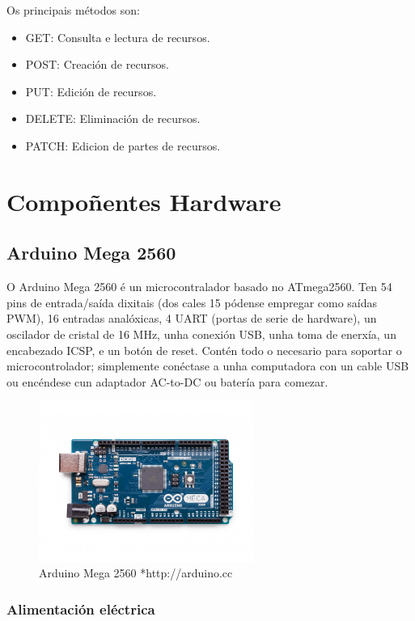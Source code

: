 \documentclass[11pt,twoside]{book}
\begin{document}
Os principais métodos son:

\begin{itemize}
    \item GET: Consulta e lectura de recursos.
    \item POST: Creación de recursos.
    \item PUT: Edición de recursos.
    \item DELETE: Eliminación de recursos.
    \item PATCH: Edicion de partes de recursos.
\end{itemize}

\chapter{Compoñentes Hardware}
\section{Arduino Mega 2560}

O Arduino Mega 2560 é un microcontralador basado no ATmega2560. Ten 54 pins de entrada/saída dixitais (dos cales 15 pódense empregar como saídas PWM), 16 entradas analóxicas, 4 UART (portas de serie de hardware), un oscilador de cristal de 16 MHz, unha conexión USB, unha toma de enerxía, un encabezado ICSP, e un botón de reset. Contén todo o necesario para soportar o microcontrolador; simplemente conéctase a unha computadora con un cable USB ou encéndese cun adaptador AC-to-DC ou batería para comezar. 

\begin{figure}[H]
	\begin{center}
		\includegraphics[width=7cm]{images/arduino_mega.jpg}
	\end{center}
	\caption{Arduino Mega 2560 *http://arduino.cc}
	\label{fig:ArduinoMega}
\end{figure}

\subsection{Alimentación eléctrica}
\end{document}
